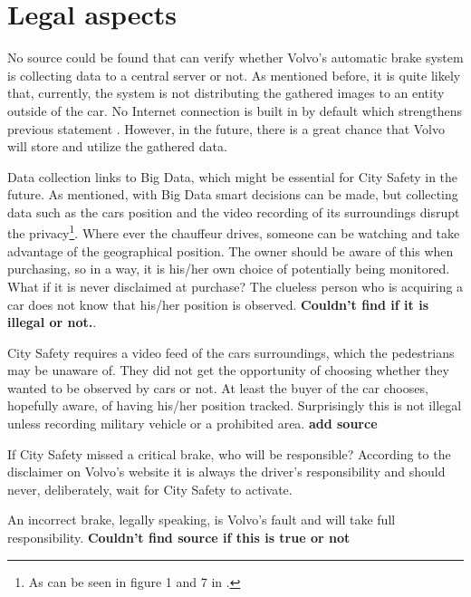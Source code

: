 \documentclass[conference]{IEEEtran}
\begin{document}

\section{Legal aspects}
No source could be found that can verify whether Volvo's automatic brake system is collecting data to a central server or not. As mentioned before, it is quite likely that, currently, the system is not distributing the gathered images to an entity outside of the car. No Internet connection is built in by default which strengthens previous statement \cite{SensusConnect}. However, in the future, there is a great chance that Volvo will store and utilize the gathered data.

Data collection links to Big Data, which might be essential for City Safety in the future. As mentioned, with Big Data smart decisions can be made, but collecting data such as the cars position and the video recording of its surroundings disrupt the privacy\footnote{As can be seen in figure 1 and 7 in \cite{SysDescription}.}.  Where ever the chauffeur drives, someone can be watching and take advantage of the geographical position. The owner should be aware of this when purchasing, so in a way, it is his/her own choice of potentially being monitored. What if it is never disclaimed at purchase? The clueless person who is acquiring a car does not know that his/her position is observed. \textbf{Couldn't find if it is illegal or not.}.

City Safety requires a video feed of the cars surroundings, which the pedestrians may be unaware of. They did not get the opportunity of choosing whether they wanted to be observed by cars or not. At least the buyer of the car chooses, hopefully aware, of having his/her position tracked. Surprisingly this is not illegal unless recording military vehicle or a prohibited area. \textbf{add source}

If City Safety missed a critical brake, who will be responsible? According to the disclaimer on Volvo's website it is always the driver's responsibility and should never, deliberately, wait for City Safety to activate. \cite{CitySafetyLegal}

An incorrect brake, legally speaking, is Volvo's fault and will take full responsibility. \textbf{Couldn't find source if this is true or not}
\end{document}
